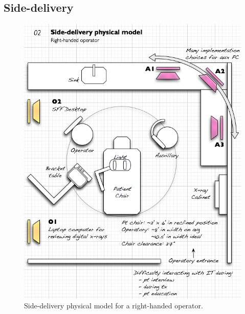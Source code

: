\documentclass[11pt]{article}
\begin{document}
\subsection{Side-delivery}
\begin{figure}[h!]
\begin{center}
\includegraphics[width=\textwidth]{phymodel2.png}
\end{center}
\caption{Side-delivery physical model for a right-handed operator.}
\end{figure}
\end{document}
